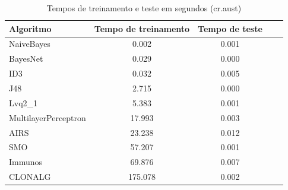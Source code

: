 \begin{table}[h!]
    \vspace{0.5cm}
    \centering
    \caption{Tempos de treinamento e teste em segundos (cr.aust)}
    \label{tbl:dev_table_aust_times}
    \vspace{0.5cm}
    \begin{tabular}{|l|c|c|c|c|}
        \hline
        \textbf{Algoritmo} & \textbf{Tempo de treinamento} & \textbf{Tempo de teste} \\
        \hline
        \rowcolor[gray]{.9}
        NaiveBayes           &   0.002 & 0.001 \\ \hline
        \rowcolor[gray]{.9}
        BayesNet             &   0.029 & 0.000 \\ \hline
        \rowcolor[gray]{.9}
        ID3                  &   0.032 & 0.005 \\ \hline
        J48                  &   2.715 & 0.000 \\ \hline
        Lvq2\_1              &   5.383 & 0.001 \\ \hline
        MultilayerPerceptron &  17.993 & 0.003 \\ \hline
        AIRS                 &  23.238 & 0.012 \\ \hline
        SMO                  &  57.207 & 0.001 \\ \hline
        Immunos              &  69.876 & 0.007 \\ \hline
        CLONALG              & 175.078 & 0.002 \\ \hline
    \end{tabular}
    \vspace{0.5cm}
\end{table}


